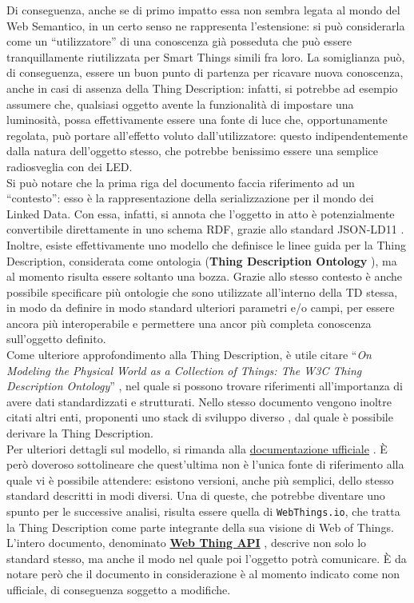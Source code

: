\documentclass[12pt,a4paper,openright,oneside]{report}
\newcommand{\quotes}[1]{``#1''}
\begin{document}
Di conseguenza, anche se di primo impatto essa non sembra legata al mondo del Web Semantico, in un certo senso ne rappresenta l'estensione: si può considerarla come un \quotes{utilizzatore} di una conoscenza già posseduta che può essere tranquillamente riutilizzata per Smart Things simili fra loro. La somiglianza può, di conseguenza, essere un buon punto di partenza per ricavare nuova conoscenza, anche in casi di assenza della Thing Description: infatti, si potrebbe ad esempio assumere che, qualsiasi oggetto avente la funzionalità di impostare una luminosità, possa effettivamente essere una fonte di luce che, opportunamente regolata, può portare all'effetto voluto dall'utilizzatore: questo indipendentemente dalla natura dell'oggetto stesso, che potrebbe benissimo essere una semplice radiosveglia con dei LED.\\

Si può notare che la prima riga del documento faccia riferimento ad un \quotes{contesto}: esso è la rappresentazione della serializzazione per il mondo dei Linked Data. Con essa, infatti, si annota che l'oggetto in atto è potenzialmente convertibile direttamente in uno schema RDF, grazie allo standard JSON-LD11 \cite{json-ld}. Inoltre, esiste effettivamente uno modello che definisce le linee guida per la Thing Description, considerata come ontologia (\textbf{Thing Description Ontology} \cite{td-ontology}), ma al momento risulta essere soltanto una bozza. Grazie allo stesso contesto è anche possibile specificare più ontologie che sono utilizzate all'interno della TD stessa, in modo da definire in modo standard ulteriori parametri e/o campi, per essere ancora più interoperabile e permettere una ancor più completa conoscenza sull'oggetto definito.\\

Come ulteriore approfondimento alla Thing Description, è utile citare \quotes{\textit{On Modeling the Physical World as a Collection of Things: The W3C Thing Description Ontology}} \cite{td-paper}, nel quale si possono trovare riferimenti all'importanza di avere dati standardizzati e strutturati. Nello stesso documento vengono inoltre citati altri enti, proponenti uno stack di sviluppo diverso \cite{open-connectivity}, dal quale è possibile derivare la Thing Description.\\

Per ulteriori dettagli sul modello, si rimanda alla \underline{documentazione ufficiale} \cite{td}. È però doveroso sottolineare che quest'ultima non è l'unica fonte di riferimento alla quale vi è possibile attendere: esistono versioni, anche più semplici, dello stesso standard descritti in modi diversi. Una di queste, che potrebbe diventare uno spunto per le successive analisi, risulta essere quella di \texttt{WebThings.io}, che tratta la Thing Description come parte integrante della sua visione di Web of Things. L'intero documento, denominato \href{https://webthings.io/api/}{\textbf{Web Thing API}} \cite{webthings}, descrive non solo lo standard stesso, ma anche il modo nel quale poi l'oggetto potrà comunicare. È da notare però che il documento in considerazione è al momento indicato come non ufficiale, di conseguenza soggetto a modifiche.\\
\end{document}
